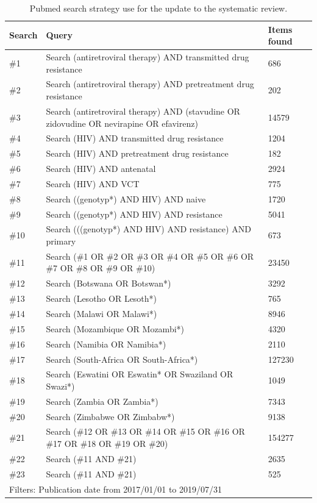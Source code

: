 \documentclass{article}
\begin{document}
	\begin{table}[h]
		\caption{Pubmed search strategy use for the update to the systematic review.}
		\label{tab:pubmed}
		\centering
		\begin{tabular}{lp{12cm}l}
			\hline
			Search    & Query           & Items found \\
			\hline
			\#1       & Search (antiretroviral therapy) AND transmitted drug resistance    & 686  \\
			\#2       & Search (antiretroviral therapy) AND pretreatment drug resistance    & 202  \\
			\#3       & Search (antiretroviral therapy) AND (stavudine OR zidovudine OR nevirapine OR efavirenz) & 14579 \\
			\#4       & Search (HIV) AND transmitted drug resistance      & 1204 \\
			\#5       & Search (HIV) AND pretreatment drug resistance      & 182  \\
			\#6       & Search (HIV) AND antenatal        & 2924 \\
			\#7       & Search (HIV) AND VCT         & 775  \\
			\#8       & Search ((genotyp*) AND HIV) AND naive       & 1720 \\
			\#9       & Search ((genotyp*) AND HIV) AND resistance      & 5041 \\
			\#10       & Search (((genotyp*) AND HIV) AND resistance) AND primary     & 673  \\
			\#11       & Search (\#1 OR \#2 OR \#3 OR \#4 OR \#5 OR \#6 OR \#7 OR \#8 OR \#9 OR \#10)  & 23450 \\
			\#12       & Search (Botswana OR Botswan*)        & 3292 \\
			\#13       & Search (Lesotho OR Lesoth*)        & 765  \\
			\#14       & Search (Malawi OR Malawi*)        & 8946 \\
			\#15       & Search (Mozambique OR Mozambi*)        & 4320 \\
			\#16       & Search (Namibia OR Namibia*)        & 2110 \\
			\#17       & Search (South-Africa OR South-Africa*)       & 127230 \\
			\#18       & Search (Eswatini OR Eswatin* OR Swaziland OR Swazi*)     & 1049 \\
			\#19       & Search (Zambia OR Zambia*)        & 7343 \\
			\#20       & Search (Zimbabwe OR Zimbabw*)        & 9138 \\
			\#21       & Search (\#12 OR \#13 OR \#14 OR \#15 OR \#16 OR \#17 OR \#18 OR \#19 OR \#20)  & 154277 \\
			\#22       & Search (\#11 AND \#21)         & 2635 \\
			\#23       & Search (\#11 AND \#21)         & 525  \\		\hline
			\multicolumn{3}{l}{Filters: Publication date from 2017/01/01 to 2019/07/31}
		\end{tabular}
	\end{table}
	
\end{document}
